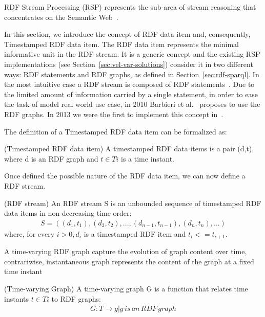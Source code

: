 RDF Stream Processing (RSP) represents the sub-area of stream reasoning that concentrates on the Semantic Web~\cite{DBLP:conf/debs/ValleDM16}.

In this section, we introduce the concept of RDF data item and, consequently, Timestamped RDF data item.
The RDF data item represents the minimal informative unit in the RDF stream. It is a generic concept and the existing RSP implementations (see Section~\ref{sec:vel-var-solutions}) consider it in two different ways: RDF statements and RDF graphs, as defined in Section~\ref{sec:rdf-sparql}.
In the most intuitive case a RDF stream is composed of RDF statements~\cite{DBLP:conf/fis/ValleCBBC08}.
Due to the limited amount of information carried by a single statement, in order to ease the task of model real world use case, in 2010 Barbieri et al.~\cite{DBLP:conf/www/BarbieriV10} proposes to use the RDF graphs. In 2013 we were the first to implement this concept in~\cite{DBLP:conf/semweb/BalduiniVDTPC13}.

The definition of a Timestamped RDF data item can be formalized as:

\begin{Definition}
(Timestamped RDF data item) A timestamped RDF data items is a pair (d,t), where d is an RDF graph and $t \in Ti$ is a time instant. 
\end{Definition}

Once defined the possible nature of the RDF data item, we can now define a RDF stream.
\begin{Definition}
(RDF stream) An RDF stream S is an unbounded sequence of timestamped RDF data items in non-decreasing time order:
\noindent\begin{align*}
S = ((d_1, t_1), (d_2, t_2), ..., (d_{n-1}, t_{n-1}), (d_n, t_n), ...)
\end{align*}  
where, for every $i > 0, d_i$ is a timestamped RDF item and $t_i <= t_{i+1}$.
\end{Definition}

A time-varying RDF graph capture the evolution of graph content over time, contrariwise, instantaneous graph represents the content of the graph at a fixed time instant

\begin{Definition}
(Time-varying Graph) A time-varying graph G is a function that relates time instants $t \in Ti$ to RDF graphs:
\noindent\begin{align*}
G : T \rightarrow {g | g\, is\, an\, RDF\, graph}
\end{align*}
\end{Definition}

